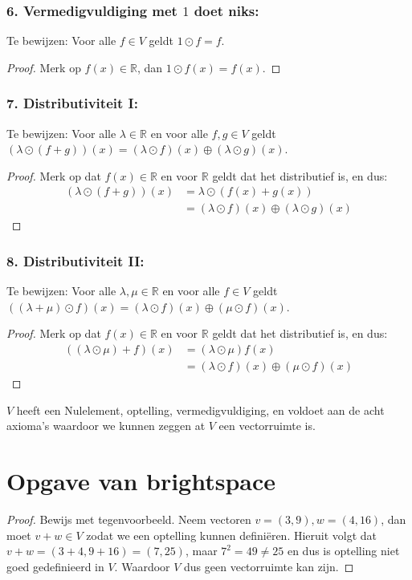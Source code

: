 \documentclass{article}
\newcommand{\R}{\mathbb{R}}
\begin{document}
\subsubsection*{6. Vermedigvuldiging met $1$ doet niks:}
Te bewijzen: Voor alle $f \in V$ geldt $1 \odot f = f$.
\begin{proof}
    Merk op $f(x) \in \R$, dan $1 \odot f(x) = f(x)$.
\end{proof}

\subsubsection*{7. Distributiviteit I:}
Te bewijzen: Voor alle $\lambda \in \R$ en voor alle $f, g \in V$ geldt $(\lambda \odot (f + g))(x) = (\lambda \odot f)(x) \oplus (\lambda \odot g)(x)$.
\begin{proof}
    Merk op dat $f(x) \in \R$ en voor $\R$ geldt dat het distributief is, en dus:
    \begin{align*}
        (\lambda \odot (f + g))(x) & = \lambda \odot (f(x) + g(x))                      \\
                                   & = (\lambda \odot f)(x) \oplus (\lambda \odot g)(x)
    \end{align*}
\end{proof}
\subsubsection*{8. Distributiviteit II:}
Te bewijzen: Voor alle $\lambda, \mu \in \R$ en voor alle $f \in V$ geldt $((\lambda + \mu) \odot f)(x) = (\lambda \odot f)(x) \oplus (\mu \odot f)(x)$.
\begin{proof}
    Merk op dat $f(x) \in \R$ en voor $\R$ geldt dat het distributief is, en dus:
    \begin{align*}
        ((\lambda \odot \mu) + f)(x) & = (\lambda \odot \mu)f(x)                      \\
                                     & = (\lambda \odot f)(x) \oplus (\mu \odot f)(x)
    \end{align*}
\end{proof}

$V$ heeft een Nulelement, optelling, vermedigvuldiging, en voldoet aan de acht axioma's
waardoor we kunnen zeggen at $V$ een vectorruimte is.

\section*{Opgave van brightspace}
\begin{proof}
    Bewijs met tegenvoorbeeld.
    Neem vectoren $v = (3, 9), w = (4, 16)$, dan moet $v + w \in V$ zodat we een optelling kunnen definiëren.
    Hieruit volgt dat $v + w = (3 + 4, 9 + 16) = (7, 25)$, maar $7^2 = 49 \neq 25$ en dus is optelling niet goed gedefinieerd in $V$.
    Waardoor $V$ dus geen vectorruimte kan zijn.
\end{proof}
\end{document}
